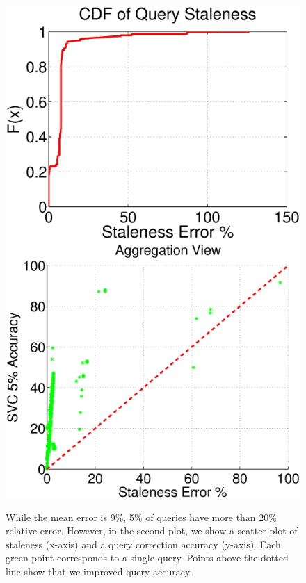 \begin{figure}[ht!]
\centering
 \includegraphics[scale=0.22]{exp/query_error_dist.eps}
 \includegraphics[scale=0.18]{exp/query_error_dist2.eps}
 \caption{While the mean error is 9\%, 5\% of queries have more than 20\% relative error. However, in the second plot, we show a scatter plot of staleness (x-axis) and a query correction accuracy (y-axis). Each green point corresponds to a single query. Points above the dotted line show that we improved query accuracy.\label{exp3dist}}
\end{figure}

